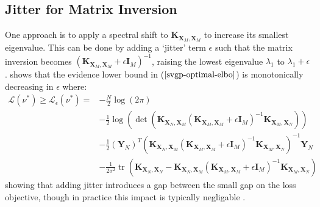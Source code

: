 \documentclass[twoside,11pt]{article}
\newcommand{\tr}{\operatorname{tr}}
\begin{document}
\subsection{Jitter for Matrix Inversion}
One approach is to apply a spectral shift to 
$\mathbf{K}_{\mathbf{X}_M, \mathbf{X}_M}$ to increase its smallest eigenvalue. This can be done by adding a `jitter' term $\epsilon$ such that the matrix inversion becomes $\left(\mathbf{K}_{\mathbf{X}_M, \mathbf{X}_M}+\epsilon\mathbf{I}_M\right)^{-1}$, raising the lowest eigenvalue $\lambda_1$ to $\lambda_1 + \epsilon$. \cite{burt2020convergence} shows that the evidence lower bound in ($\ref{svgp-optimal-elbo}$) is monotonically decreasing in $\epsilon$ where:
\begin{align}
    \label{svgp-optimal-elbo-jitter}
    \mathcal{L}(\nu^*) \geq \mathcal{L}_{\epsilon}(\nu^*) = & -\frac{N}{2} \log\left(2\pi \right) \\
    & -\frac{1}{2} \log \left(\det\left( \mathbf{K}_{\mathbf{X}_N, \mathbf{X}_M}\left(\mathbf{K}_{\mathbf{X}_M, \mathbf{X}_M} +\epsilon\mathbf{I}_M\right)^{-1} \mathbf{K}_{\mathbf{X}_M, \mathbf{X}_N}\right)\right)\\
    & -\frac{1}{2} \left(\mathbf{Y}_N\right)^T \left( \mathbf{K}_{\mathbf{X}_N, \mathbf{X}_M}\left(\mathbf{K}_{\mathbf{X}_M, \mathbf{X}_M}+\epsilon\mathbf{I}_M\right)^{-1} \mathbf{K}_{\mathbf{X}_M, \mathbf{X}_N}\right)^{-1} \mathbf{Y}_N \\
    & - \frac{1}{2\sigma^2}\tr\left(\mathbf{K}_{\mathbf{X}_N, \mathbf{X}_N} - \mathbf{K}_{\mathbf{X}_N, \mathbf{X}_M}\left(\mathbf{K}_{\mathbf{X}_M, \mathbf{X}_M}+\epsilon\mathbf{I}_M\right)^{-1} \mathbf{K}_{\mathbf{X}_M, \mathbf{X}_N}\right)
\end{align}
showing that adding jitter introduces a gap between the small gap on the loss objective, though in practice this impact is typically negligable \cite{burt2020convergence}.
\end{document}
